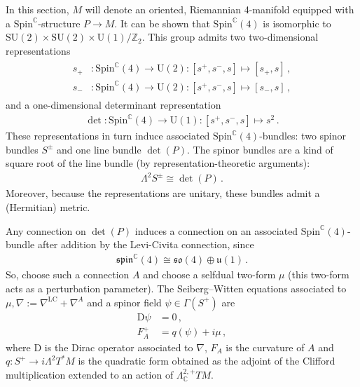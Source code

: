     In this section, $M$ will denote an oriented, Riemannian 4-manifold equipped with a $\mathrm{Spin}^{\mathbb{C}}$-structure $P\rightarrow M$. It can be shown that $\mathrm{Spin}^{\mathbb{C}}(4)$ is isomorphic to $\mathrm{SU}(2)\times\mathrm{SU}(2)\times\mathrm{U}(1)/\mathbb{Z}_2$. This group admits two two-dimensional representations
    \begin{gather}
        \begin{aligned}
            s_+&:\mathrm{Spin}^{\mathbb{C}}(4)\rightarrow\mathrm{U}(2):[s^+,s^-,s]\mapsto[s_+,s]\,,\\
            s_-&:\mathrm{Spin}^{\mathbb{C}}(4)\rightarrow\mathrm{U}(2):[s^+,s^-,s]\mapsto[s_-,s]\,,
        \end{aligned}
    \end{gather}
    and a one-dimensional determinant representation
    \begin{gather}
        \det:\mathrm{Spin}^{\mathbb{C}}(4)\rightarrow\mathrm{U}(1):[s^+,s^-,s]\mapsto s^2\,.
    \end{gather}
    These representations in turn induce associated $\mathrm{Spin}^{\mathbb{C}}(4)$-bundles: two spinor bundles $S^\pm$ and one line bundle $\det(P)$. The spinor bundles are a kind of square root of the line bundle (by representation-theoretic arguments):
    \begin{gather}
        \Lambda^2S^\pm\cong\det(P)\,.
    \end{gather}
    Moreover, because the representations are unitary, these bundles admit a (Hermitian) metric.

    Any connection on $\det(P)$ induces a connection on an associated $\mathrm{Spin}^{\mathbb{C}}(4)$-bundle after addition by the Levi-Civita connection, since
    \begin{gather}
        \mathfrak{spin}^{\mathbb{C}}(4)\cong\mathfrak{so}(4)\oplus\mathfrak{u}(1)\,.
    \end{gather}
    So, choose such a connection $A$ and choose a selfdual two-form $\mu$ (this two-form acts as a perturbation parameter). The Seiberg--Witten equations associated to $\mu,\nabla:=\nabla^\mathrm{LC}+\nabla^A$ and a spinor field $\psi\in\Gamma(S^+)$ are
    \begin{align}
        \mathrm{D}\psi &= 0\,,\\
        F_A^+ &= q(\psi) + i\mu\,,\label{unification:sw2}
    \end{align}
    where $\mathrm{D}$ is the Dirac operator associated to $\nabla$, $F_A$ is the curvature of $A$ and $q:S^+\rightarrow i\Lambda^2T^*M$ is the quadratic form obtained as the adjoint of the Clifford multiplication extended to an action of $\Lambda^{2,+}_{\mathbb{C}}TM$.

